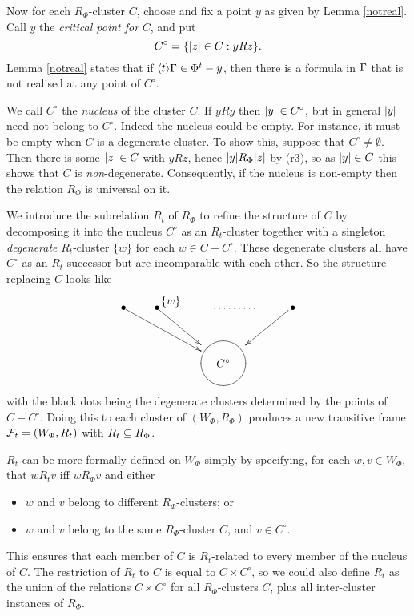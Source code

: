 Now for each $R_\Phi$-cluster $C$, choose and fix a
 point $y$ as given by Lemma \ref{notreal}. Call $y$  the \emph{critical point for} $C$, and put
$$
C^\circ=\{|z|\in C: yRz \}.
$$ 
Lemma \ref{notreal} states that if $\langle t\rangle\Gamma\in \Phi^t-y$, then there is a formula in $\Gamma$ that is not realised at any point of 
$C^\circ$. 

We call $C^\circ$ the \emph{nucleus} of the cluster $C$. If $yRy$ then $|y|\in C^\circ$, but in general $|y|$ need not belong to $C^\circ$. Indeed the nucleus could be empty. For instance, it must be empty when $C$ is a degenerate cluster. To show this, suppose that $C^\circ\ne\emptyset$. Then there is some $|z|\in C$ with $yRz$, hence $|y|R_\Phi|z|$ by (r3), so as $|y|\in C$ this shows that $C$ is \emph{non}-degenerate. Consequently, if the nucleus is non-empty then the relation $R_\Phi$ is universal on it.


  We introduce the subrelation $R_t$ of $R_\Phi$ to refine the structure of $C$ by decomposing it into the nucleus
  $C^\circ$ as an $R_t$-cluster together with a singleton \emph{degenerate} $R_t$-cluster $\{w\}$ for each $w\in C-C^\circ$. These degenerate clusters all have $C^\circ$ as an $R_t$-successor but are incomparable  with each other. So the structure replacing $C$ looks like
$$
\xymatrix{
*{\bullet} \ar[drr]^<{}  &*{\bullet} \ar[dr]^<{\textstyle\{w\}}  & {\qquad\cdots\cdots\cdots}   &*{\ \bullet^{}} \ar[dl]   \\
& &*{\xy ;<1pc,0pc>:\POS(0,0) +(0,-1.5)*+{C^\circ}*\cir<20pt>{} \endxy}  &{\hspace{-2.3cm}}
}
$$
with the  black dots being the degenerate clusters determined by the  points of $C-C^\circ$. 
Doing this to each cluster of $(W_\Phi,R_\Phi)$ produces a new transitive frame $\mathcal{F}_t=(W_\Phi,R_t)$ with $R_t\subseteq R_\Phi$.  

$R_t$ can be more formally defined on $W_\Phi$ simply  by specifying, for each $w,v\in W_\Phi$, that $wR_tv$ iff  $wR_\Phi v$ and either
\begin{itemize}
\item 
$w$ and $v$ belong to different $R_\Phi$-clusters; \enspace or
\item
$w$ and $v$ belong to the same $R_\Phi$-cluster $C$, and $v\in C^\circ$.
\end{itemize}
This ensures that each member of $C$ is $R_t$-related to every member of the nucleus of $C$. The restriction of $R_t$ to $C$ is equal to $C\times C^\circ$, so we could also define $R_t$ as the union of  the relations $C\times C^\circ$ for all $R_\Phi$-clusters $C$, plus all inter-cluster instances of $R_\Phi$.

